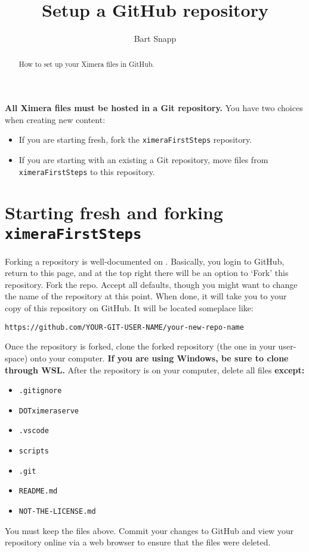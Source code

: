 \documentclass{ximera}
\title{Setup a GitHub repository}
\author{Bart Snapp}
\begin{document}
\begin{abstract}
  How to set up your Ximera files in GitHub.
\end{abstract}
\maketitle

\textbf{All Ximera files must be hosted in a Git repository.} You have two
choices when creating new content:
\begin{itemize}
  \item If you are starting fresh, fork the \texttt{ximeraFirstSteps}
        repository.
  \item If you are starting with an existing a Git repository, move files
        from \texttt{ximeraFirstSteps} to this repository.
\end{itemize}

\section{Starting fresh and forking \texttt{ximeraFirstSteps}}

Forking a repository is well-documented on
.
Basically, you login to GitHub, return to this page, and at the top right there
will be an option to `Fork' this repository. Fork the repo. Accept all
defaults, though you might want to change the name of the repository at this
point. When done, it will take you to
your copy of this repository on GitHub. It will be located someplace like:
\begin{center}
  \texttt{https://github.com/YOUR-GIT-USER-NAME/your-new-repo-name}
\end{center}
Once the repository is forked, clone the forked repository (the one in your
user-space) onto your computer. \textbf{If you are using Windows, be sure to
  clone through WSL.}
After the repository is on your computer, delete all files \textbf{except:}
\begin{itemize}
  \item \texttt{.gitignore}
  \item \texttt{DOTximeraserve}
  \item \texttt{.vscode}
  \item \texttt{scripts}
  \item \texttt{.git}
  \item \texttt{README.md}
  \item \texttt{NOT-THE-LICENSE.md}
\end{itemize}
You must keep the files above.	Commit your changes to GitHub and view your
repository online via a web browser to ensure that the files were deleted.
\end{document}
